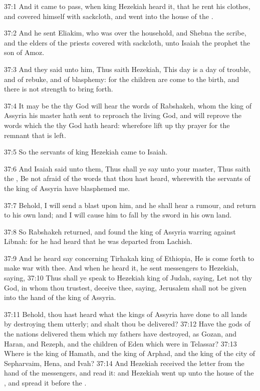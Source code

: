 37:1 And it came to pass, when king Hezekiah heard it, that he rent
his clothes, and covered himself with sackcloth, and went into the
house of the \LORD.

37:2 And he sent Eliakim, who was over the household, and Shebna the
scribe, and the elders of the priests covered with sackcloth, unto
Isaiah the prophet the son of Amoz.

37:3 And they said unto him, Thus saith Hezekiah, This day is a day of
trouble, and of rebuke, and of blasphemy: for the children are come to
the birth, and there is not strength to bring forth.

37:4 It may be the \LORD thy God will hear the words of Rabshakeh, whom
the king of Assyria his master hath sent to reproach the living God,
and will reprove the words which the \LORD thy God hath heard:
wherefore lift up thy prayer for the remnant that is left.

37:5 So the servants of king Hezekiah came to Isaiah.

37:6 And Isaiah said unto them, Thus shall ye say unto your master,
Thus saith the \LORD, Be not afraid of the words that thou hast heard,
wherewith the servants of the king of Assyria have blasphemed me.

37:7 Behold, I will send a blast upon him, and he shall hear a rumour,
and return to his own land; and I will cause him to fall by the sword
in his own land.

37:8 So Rabshakeh returned, and found the king of Assyria warring
against Libnah: for he had heard that he was departed from Lachish.

37:9 And he heard say concerning Tirhakah king of Ethiopia, He is come
forth to make war with thee. And when he heard it, he sent messengers
to Hezekiah, saying, 37:10 Thus shall ye speak to Hezekiah king of
Judah, saying, Let not thy God, in whom thou trustest, deceive thee,
saying, Jerusalem shall not be given into the hand of the king of
Assyria.

37:11 Behold, thou hast heard what the kings of Assyria have done to
all lands by destroying them utterly; and shalt thou be delivered?
37:12 Have the gods of the nations delivered them which my fathers
have destroyed, as Gozan, and Haran, and Rezeph, and the children of
Eden which were in Telassar?  37:13 Where is the king of Hamath, and
the king of Arphad, and the king of the city of Sepharvaim, Hena, and
Ivah?  37:14 And Hezekiah received the letter from the hand of the
messengers, and read it: and Hezekiah went up unto the house of the
\LORD, and spread it before the \LORD.

